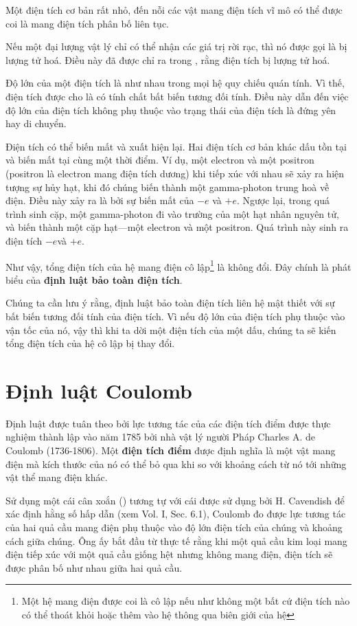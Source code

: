\noindent
Một điện tích cơ bản rất nhỏ, đến nỗi các vật mang điện tích vĩ mô có thể được coi là mang điện tích phân bố liên tục.

Nếu một đại lượng vật lý chỉ có thể nhận các giá trị rời rạc, thì nó được gọi là bị lượng tử hoá. Điều này đã được chỉ ra trong , rằng điện tích bị lượng tử hoá. 

Độ lớn của một điện tích là như nhau trong mọi hệ quy chiếu quán tính. Vì thế, điện tích được cho là có tính chất bất biến tương đối tính. Điều này dẫn đến việc độ lớn của điện tích không phụ thuộc vào trạng thái của điện tích là đứng yên hay di chuyển.

Điện tích có thể biến mất và xuất hiện lại. Hai điện tích cơ bản khác dấu tồn tại và biến mất tại cùng một thời điểm. Ví dụ, một electron và một positron (positron là electron mang điện tích dương) khi tiếp xúc với nhau sẽ xảy ra hiện tượng sự hủy hạt, khi đó chúng biến thành một gamma-photon trung hoà về điện. Điều này xảy ra là bởi sự biến mất của $-e$ và $+e$. Ngược lại, trong quá trình sinh cặp, một gamma-photon đi vào trường của một hạt nhân nguyên tử, và biến thành một cặp hạt---một electron và một positron. Quá trình này sinh ra điện tích $-e$và $+e$.

Như vậy, tổng điện tích của hệ mang điện cô lập\footnote{Một hệ mang điện được coi là cô lập nếu như không một bất cứ điện tích nào có thể thoát khỏi hoặc thêm vào hệ thông qua biên giới của hệ} là không đổi. Đây chính là phát biểu của \textbf{định luật bảo toàn điện tích}.

Chúng ta cần lưu ý rằng, định luật bảo toàn điện tích liên hệ mật thiết với sự bất biến tương đối tính của điện tích. Vì nếu độ lớn của điện tích phụ thuộc vào vận tốc của nó, vậy thì khi ta dời một điện tích của một dấu, chúng ta sẽ kiến tổng điện tích của hệ cô lập bị thay đổi.

\section{Định luật Coulomb}\label{sec:1_2}

Định luật được tuân theo bởi lực tương tác của các điện tích điểm được thực nghiệm thành lập vào năm 1785 bởi nhà vật lý người Pháp Charles A. de Coulomb (1736-1806). Một \textbf{điện tích điểm} được định nghĩa là một vật mang điện mà kích thước của nó có thể bỏ qua khi so với khoảng cách từ nó tới những vật thể mang điện khác.

Sử dụng một cái cân xoắn () tương tự với cái được sử dụng bởi H. Cavendish để xác định hằng số hấp dẫn (xem Vol. I, Sec. 6.1), Coulomb đo được lực tương tác của hai quả cầu mang điện phụ thuộc vào độ lớn điện tích của chúng và khoảng cách giữa chúng. Ông ấy bắt đầu từ thực tế rằng khi một quả cầu kim loại mang điện tiếp xúc với một quả cầu giống hệt nhưng không mang điện, điện tích sẽ được phân bố như nhau giữa hai quả cầu.

